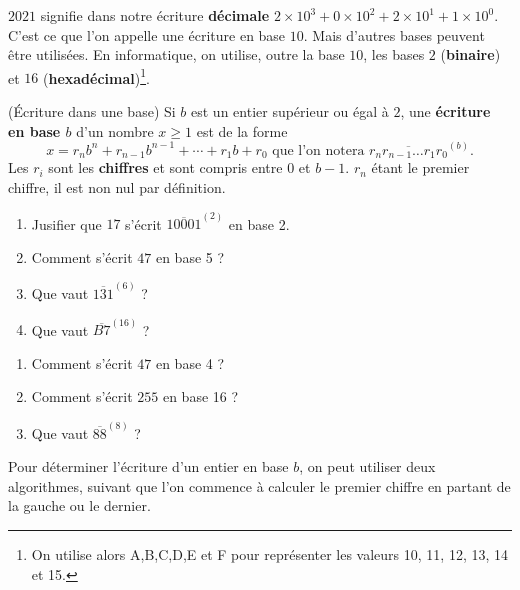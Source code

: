 $2021$ signifie dans notre écriture \textbf{décimale} $2\times 10^3 + 0 \times 10^2 + 2 \times 10^1 + 1 \times 10^0$. C'est ce que l'on appelle une écriture en
base $10$. Mais d'autres bases peuvent être utilisées. En informatique, on utilise, outre la base $10$, les bases $2$ (\textbf{binaire}) et $16$ (\textbf{hexadécimal})\footnote{On utilise alors A,B,C,D,E et F pour représenter les valeurs 10, 11, 12, 13, 14 et 15.}.
\bigskip

\begin{définition}{(\'Ecriture dans une base)}
Si $b$ est un entier supérieur ou égal à $2$, une \textbf{écriture en base $b$} d'un nombre $x \geq 1$ est de la forme
$$x = r_n b^n + r_{n-1} b^{n-1} + \cdots + r_1 b + r_0 \text{ que l'on notera } \overline{r_n r_{n-1} \dots r_1 r_0}^{(b)}.$$ 
Les $r_i$ sont les \textbf{chiffres} et sont compris entre $0$ et $b-1$. $r_n$ étant le premier chiffre,
il est non nul par définition.

\end{définition}

\exercice{}
\begin{enumerate}
\item Jusifier que $17$ s'écrit $\overline{10001}^{(2)}$ en base 2.

\item Comment s'écrit $47$ en base 5 ? 


\item Que vaut $\overline{131}^{ (6)}$ ?

\item Que vaut $\overline{B7}^{ (16)}$ ?

\end{enumerate}



\entrainement
\begin{enumerate}

\item Comment s'écrit $47$ en base 4 ? 

\item Comment s'écrit $255$ en base 16 ?


\item Que vaut $\overline{88}^{ (8)}$ ?

\end{enumerate}
\smallskip
\vfill
\eject

Pour déterminer l'écriture d'un entier en base $b$, on peut utiliser deux algorithmes, suivant que l'on commence à calculer le premier chiffre en partant de la gauche ou le dernier.

